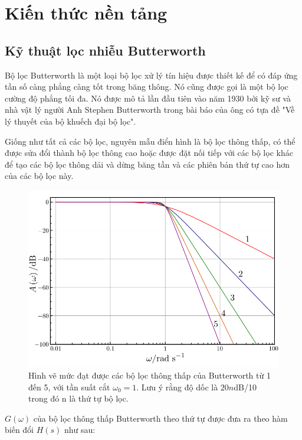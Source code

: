 \chapter{Kiến thức nền tảng}
\thispagestyle{fancy}

\section{Kỹ thuật lọc nhiễu Butterworth}
Bộ lọc Butterworth là một loại bộ lọc xử lý tín hiệu được thiết kế để có đáp ứng tần số càng phẳng càng tốt trong băng thông. Nó cũng được gọi là một bộ lọc cường độ phẳng tối đa. Nó được mô tả lần đầu tiên vào năm 1930 bởi kỹ sư và nhà vật lý người Anh Stephen Butterworth trong bài báo của ông có tựa đề "Về lý thuyết của bộ khuếch đại bộ lọc".

Giống như tất cả các bộ lọc, nguyên mẫu điển hình là bộ lọc thông thấp, có thể được sửa đổi thành bộ lọc thông cao hoặc được đặt nối tiếp với các bộ lọc khác để tạo các bộ lọc thông dải và dừng băng tần và các phiên bản thứ tự cao hơn của các bộ lọc này.

\begin{center}
    \begin{figure}[htp]
    \begin{center}
    \includegraphics[scale=.4]{image/chapter4/800px-Butterworth_Filter_Orders.png}
    \end{center}
    \caption[Mức đạt được các bộ lọc thông thấp]{Hình vẽ mức đạt được các bộ lọc thông thấp của Butterworth từ 1 đến 5, với tần suất cắt $\omega_0 = 1$. Lưu ý rằng độ dốc là $20n$dB/10 trong đó n là thứ tự bộ lọc.}
    \end{figure}
\end{center}
$G(\omega)$ của bộ lọc thông thấp Butterworth theo thứ tự được đưa ra theo hàm biến đổi $H(s)$ như sau:\\

